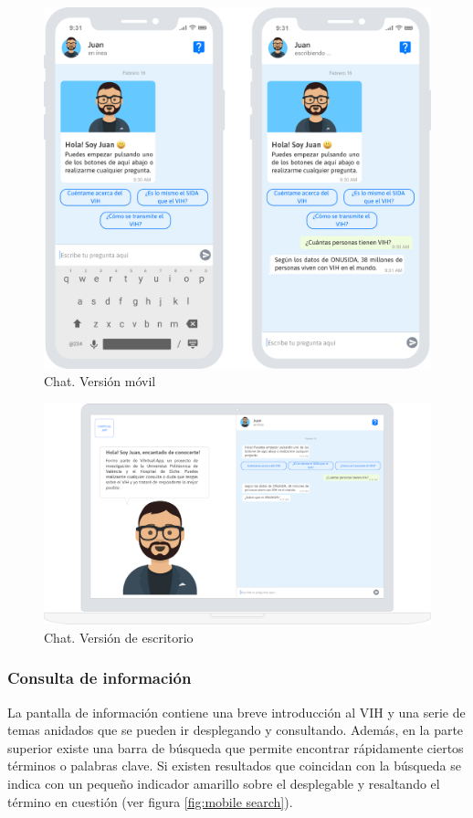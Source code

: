 \begin{figure}[htbp]
\centering
\includegraphics[scale=0.2]{../images/mobile_chat.png} 
\caption{Chat. Versión móvil}
\label{fig:mobile chat}
\end{figure}

\begin{figure}[htbp]
\centering
\includegraphics[scale=0.2]{../images/desktop_chat.png} 
\caption{Chat. Versión de escritorio}
\label{fig:desktop chat}
\end{figure}


\subsubsection{Consulta de información}
La pantalla de información contiene una breve introducción al VIH y una serie de temas anidados que se pueden ir desplegando y consultando. Además, en la parte superior existe una barra de búsqueda que permite encontrar rápidamente ciertos términos o palabras clave. Si existen resultados que coincidan con la búsqueda se indica con un pequeño indicador amarillo sobre el desplegable y resaltando el término en cuestión (ver figura \ref{fig:mobile search}).\\


